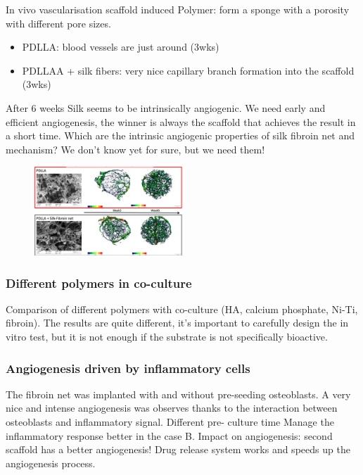 In vivo vascularisation scaffold induced
Polymer: form a sponge with a porosity with different pore sizes. 
\begin{itemize}
\item PDLLA: blood vessels are just around (3wks)
\item PDLLAA + silk fibers: very nice capillary branch formation into the scaffold (3wks)
\end{itemize}
After 6 weeks Silk seems to be intrinsically angiogenic.
We need early and efficient angiogenesis, the winner is always the scaffold that achieves the result in a short time. Which are the intrinsic angiogenic properties of silk fibroin net and mechanism? We don’t know yet for sure, but we need them!

\begin{figure}[h]
\centering
\includegraphics[width=0.5\textwidth]{pdlla}
\caption{\label{fig:pdlla}}
\end{figure}

\subsubsection{Different polymers in co-culture}
Comparison of different polymers with co-culture (HA, calcium phosphate, Ni-Ti, fibroin). The results are quite different, it’s important to carefully design the in vitro test, but it is not enough if the substrate is not specifically bioactive.

\subsubsection{Angiogenesis driven by inflammatory cells}
The fibroin net was implanted with and without pre-seeding osteoblasts. A very nice and intense angiogenesis was observes thanks to the interaction between osteoblasts and inflammatory signal.
Different pre- culture time
Manage the inflammatory response better in the case B.
Impact on angiogenesis: second scaffold has a better angiogenesis!
Drug release system works and speeds up the angiogenesis process.

